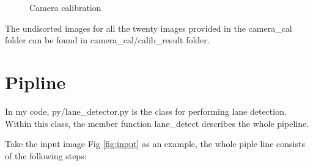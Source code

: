 \documentclass[12pt]{article}
\begin{document}
\begin{figure}[h]
\centering
{}
\qquad
{}
\qquad
{}
\qquad
{}
\caption{Camera calibration}
\end{figure}

The undisorted images for all the twenty images provided in the  camera\_cal folder can be found in  camera\_cal/calib\_result folder.
  
    
\section{Pipline}
In my code, py/lane\_detector.py is the class for performing lane detection. Within this class, the member function lane\_detect describes the whole pipeline.

Take the input image Fig \ref{fig:input} as an example, the whole piple line consists of the following steps:
\end{document}
